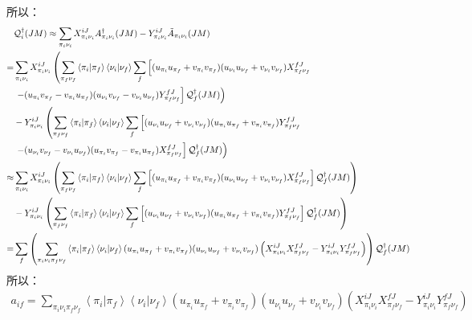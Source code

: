 \documentclass[master]{shnuthesis}
\begin{document}
所以：
\begin{align}
    & \mathcal{Q}_i^\dagger(JM) \approx \sum_{\pi_i\nu_i} X_{\pi_i\nu_i}^{iJ} A_{\pi_i\nu_i}^\dagger(JM) - Y_{\pi_i\nu_i}^{iJ} \tilde{A}_{\pi_i\nu_i}(JM) \notag\\
    = & \sum_{\pi_i\nu_i} X_{\pi_i\nu_i}^{iJ} \left( \sum_{\pi_f \nu_f} \left\langle \pi_i|\pi_f \right\rangle \left\langle \nu_i|\nu_f \right\rangle \sum_{f} \left[(u_{\pi_i}u_{\pi_f}+v_{\pi_i}v_{\pi_f})(u_{\nu_i}u_{\nu_f}+v_{\nu_i}v_{\nu_f})X_{\pi_f\nu_f}^{fJ} \right.\right.\notag\\
    & \left.\left.- (u_{\pi_i}v_{\pi_f}-v_{\pi_i}u_{\pi_f})(u_{\nu_i}v_{\nu_f}-v_{\nu_i}u_{\nu_f}) Y_{\pi_f\nu_f}^{fJ} \right] \mathcal{Q}_f^\dagger(JM) \right) \notag\\
    & - Y_{\pi_i\nu_i}^{iJ} \left( \sum_{\pi_f \nu_f}\left\langle \pi_i|\pi_f \right\rangle\left\langle \nu_i|\nu_f \right\rangle \sum_{f} \left[(u_{\nu_i}u_{\nu_f}+v_{\nu_i}v_{\nu_f})(u_{\pi_i}u_{\pi_f}+v_{\pi_i}v_{\pi_f}) Y_{\pi_f\nu_f}^{fJ} \right.\right. \notag\\
    & \left.\left. - (u_{\nu_i}v_{\nu_f}-v_{\nu_i}u_{\nu_f})(u_{\pi_i}v_{\pi_f}-v_{\pi_i}u_{\pi_f}) X_{\pi_f\nu_f}^{fJ} \right] \mathcal{Q}_f^\dagger(JM) \right) \notag\\
    \approx & \sum_{\pi_i\nu_i} X_{\pi_i\nu_i}^{iJ} \left( \sum_{\pi_f \nu_f} \left\langle \pi_i|\pi_f \right\rangle \left\langle \nu_i|\nu_f \right\rangle \sum_{f} \left[(u_{\pi_i}u_{\pi_f}+v_{\pi_i}v_{\pi_f})(u_{\nu_i}u_{\nu_f}+v_{\nu_i}v_{\nu_f})X_{\pi_f\nu_f}^{fJ} \right] \mathcal{Q}_f^\dagger(JM) \right) \notag\\
    & - Y_{\pi_i\nu_i}^{iJ} \left( \sum_{\pi_f \nu_f}\left\langle \pi_i|\pi_f \right\rangle\left\langle \nu_i|\nu_f \right\rangle \sum_{f} \left[(u_{\nu_i}u_{\nu_f}+v_{\nu_i}v_{\nu_f})(u_{\pi_i}u_{\pi_f}+v_{\pi_i}v_{\pi_f}) Y_{\pi_f\nu_f}^{fJ} \right] \mathcal{Q}_f^\dagger(JM) \right) \notag\\
    = & \sum_{f} \left( \sum_{\pi_i \nu_i \pi_f \nu_f} \left\langle \pi_i|\pi_f \right\rangle \left\langle \nu_i|\nu_f \right\rangle (u_{\pi_i}u_{\pi_f}+v_{\pi_i}v_{\pi_f})(u_{\nu_i}u_{\nu_f}+v_{\nu_i}v_{\nu_f})\left(X_{\pi_i\nu_i}^{iJ} X_{\pi_f\nu_f}^{fJ} - Y_{\pi_i\nu_i}^{iJ} Y_{\pi_f\nu_f}^{fJ}\right) \right) \mathcal{Q}_f^\dagger(JM) 
\end{align}
所以：
\begin{align}
    a_{if} = \sum_{\pi_i \nu_i \pi_f \nu_f} \left\langle \pi_i|\pi_f \right\rangle \left\langle \nu_i|\nu_f \right\rangle (u_{\pi_i}u_{\pi_f}+v_{\pi_i}v_{\pi_f})(u_{\nu_i}u_{\nu_f}+v_{\nu_i}v_{\nu_f})\left(X_{\pi_i\nu_i}^{iJ} X_{\pi_f\nu_f}^{fJ} - Y_{\pi_i\nu_i}^{iJ} Y_{\pi_f\nu_f}^{fJ}\right)
\end{align}
\end{document}
